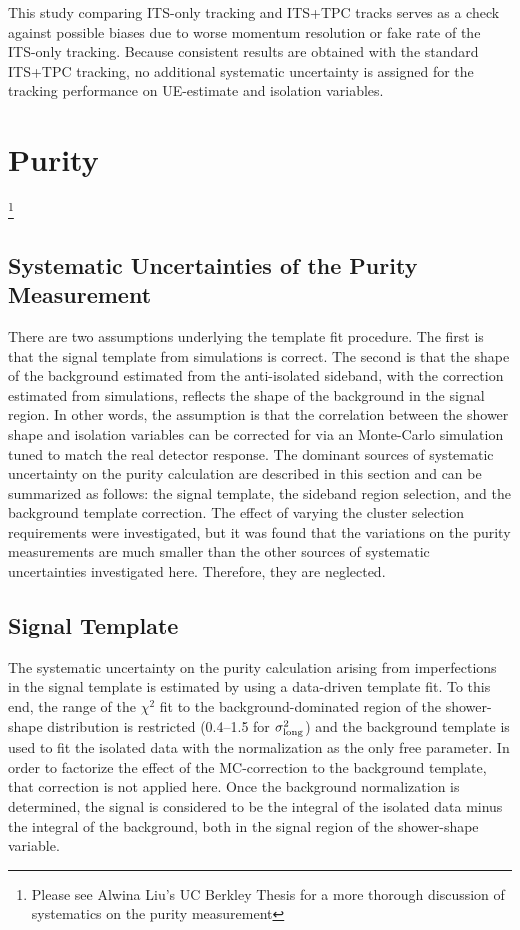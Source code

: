 This study comparing ITS-only tracking and ITS+TPC tracks serves as a check against possible biases due to worse momentum resolution or fake rate of the ITS-only tracking. Because consistent results are obtained with the standard ITS+TPC tracking, no additional systematic uncertainty is assigned for the tracking performance on UE-estimate and isolation variables. 



\section{Purity}\footnote{Please see Alwina Liu's UC Berkley Thesis for a more thorough discussion of systematics on the purity measurement}
\subsection{Systematic Uncertainties of the Purity Measurement}
\label{sec:puritysystematics}
There are two assumptions underlying the template fit procedure. The first is that the signal template from simulations is correct. The second is that the shape of the background estimated from the anti-isolated sideband, with the correction estimated from simulations, reflects the shape of the background in the signal region. In other words, the assumption is that the correlation between the shower shape and isolation variables can be corrected for via an Monte-Carlo simulation tuned to match the real detector response. The dominant sources of systematic uncertainty on the purity calculation are described in this section and can be summarized as follows: the signal template, the sideband region selection, and the background template correction. The effect of varying the cluster selection requirements were investigated, but it was found that the variations on the purity measurements are much smaller than the other sources of systematic uncertainties investigated here. Therefore, they are neglected. 

\subsection{Signal Template}
The systematic uncertainty on the purity calculation arising from imperfections in the signal template is estimated by using a data-driven template fit. To this end, the range of the $\chi^{2}$ fit to the background-dominated region of the shower-shape distribution is restricted (0.4--1.5 for $\sigma^{2}_{\mathrm{long}}$) and the background template is used to fit the isolated data with the normalization as the only free parameter. In order to factorize the effect of the MC-correction to the background template, that correction is not applied here. Once the background normalization is determined, the signal is considered to be the integral of the isolated data minus the integral of the background, both in the signal region of the shower-shape variable. 

